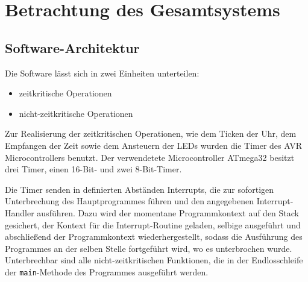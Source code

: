 \section{Betrachtung des Gesamtsystems}
\subsection{Software-Architektur}
Die Software lässt sich in zwei Einheiten unterteilen:
\begin{itemize}
  \item zeitkritische Operationen
  \item nicht-zeitkritische Operationen
\end{itemize}
Zur Realisierung der zeitkritischen Operationen, wie dem Ticken der Uhr, dem Empfangen der Zeit sowie dem Ansteuern der LEDs wurden die Timer des AVR Microcontrollers benutzt. Der verwendetete Microcontroller ATmega32 besitzt drei Timer, einen 16-Bit- und zwei 8-Bit-Timer.

Die Timer senden in definierten Abständen Interrupts, die zur sofortigen Unterbrechung des Hauptprogrammes führen und den angegebenen Interrupt-Handler ausführen. Dazu wird der momentane Programmkontext auf den Stack gesichert, der Kontext für die Interrupt-Routine geladen, selbige ausgeführt und abschließend der Programmkontext wiederhergestellt, sodass die Ausführung des Programmes an der selben Stelle fortgeführt wird, wo es unterbrochen wurde. Unterbrechbar sind alle nicht-zeitkritischen Funktionen, die in der Endlosschleife der \texttt{main}-Methode des Programmes ausgeführt werden.

